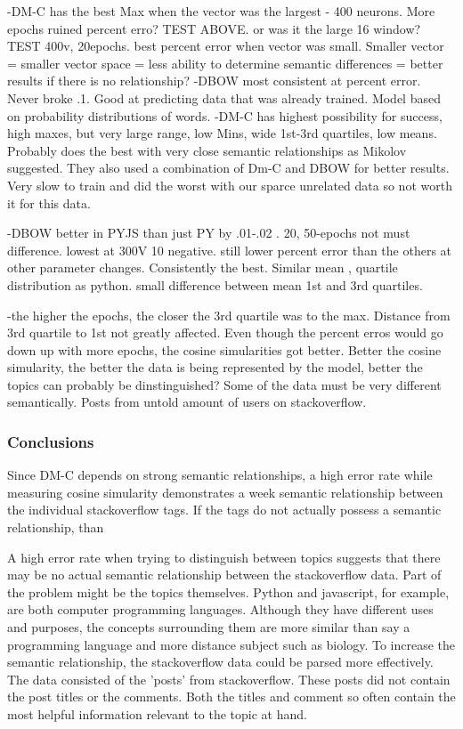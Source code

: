 -DM-C has the best Max when the vector was the largest - 400 neurons. More epochs ruined percent erro? TEST ABOVE. or was it the large 16 window? TEST 400v, 20epochs. best percent error when vector was small. Smaller vector = smaller vector space = less ability to determine semantic differences = better results if there is no relationship? -DBOW most consistent at percent error. Never broke .1. Good at predicting data that was already trained. Model based on probability distributions of words.
-DM-C has highest possibility for success, high maxes, but very large range, low Mins, wide 1st-3rd quartiles, low means. Probably does the best with very close semantic relationships as Mikolov suggested. They also used a combination of Dm-C and DBOW for better results. Very slow to train and did the worst with our sparce unrelated data so not worth it for this data.


-DBOW better in PYJS than just PY by .01-.02 . 20, 50-epochs not must difference. lowest at 300V 10 negative. still lower percent error than the others at other parameter changes. Consistently the best. Similar mean , quartile distribution as python. small difference between mean 1st and 3rd quartiles.


-the higher the epochs, the closer the 3rd quartile was to the max. Distance from 3rd quartile to 1st not greatly affected. Even though the percent erros would go down up with more epochs, the cosine simularities got better. Better the cosine simularity, the better the data is being represented by the model, better the topics can probably be dinstinguished? Some of the data must be very different semantically. Posts from untold amount of users on stackoverflow. 





 


\subsubsection{Conclusions}
Since DM-C depends on strong semantic relationships, a high error rate while measuring cosine simularity demonstrates a week semantic relationship between the individual stackoverflow tags. If the tags do not actually possess a semantic relationship, than 

A high error rate when trying to distinguish between topics suggests that there may be no actual semantic relationship between the stackoverflow data. Part of the problem might be the topics themselves. Python and javascript, for example, are both computer programming languages. Although they have different uses and purposes, the concepts surrounding them are more similar than say a programming language and more distance subject such as biology. To increase the semantic relationship, the stackoverflow data could be parsed more effectively. The data consisted of the 'posts' from stackoverflow. These posts did not contain the post titles or the comments. Both the titles and comment so often contain the most helpful information relevant to the topic at hand. 


